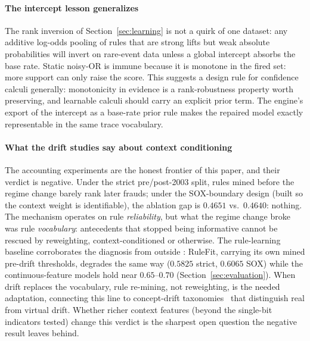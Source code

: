 \paragraph{The intercept lesson generalizes} The rank inversion of
Section~\ref{sec:learning} is not a quirk of one dataset: any additive
log-odds pooling of rules that are strong lifts but weak absolute
probabilities will invert on rare-event data unless a global intercept
absorbs the base rate. Static noisy-OR is immune because it is monotone
in the fired set: more support can only raise the score. This
suggests a design rule for confidence calculi generally: monotonicity in
evidence is a rank-robustness property worth preserving, and learnable
calculi should carry an explicit prior term. The engine's export of the
intercept as a base-rate prior rule makes the repaired model exactly
representable in the same trace vocabulary.

\paragraph{What the drift studies say about context conditioning} The
accounting experiments are the honest frontier of this paper, and their
verdict is negative. Under the strict pre/post-2003 split, rules mined
before the regime change barely rank later frauds; under the
SOX-boundary design (built so the context weight is identifiable),
the ablation gap is $0.4651$ vs.\ $0.4640$: nothing. The mechanism
operates on rule \emph{reliability}, but what the regime change broke
was rule \emph{vocabulary}: antecedents that stopped being informative
cannot be rescued by reweighting, context-conditioned or otherwise.
The rule-learning baseline corroborates the diagnosis from outside
\pla{}: RuleFit, carrying its own mined pre-drift thresholds, degrades
the same way ($0.5825$ strict, $0.6065$ SOX) while the
continuous-feature models hold near $0.65$--$0.70$
(Section~\ref{sec:evaluation}).
When drift replaces the vocabulary, rule re-mining, not reweighting,
is the needed adaptation, connecting this line to concept-drift
taxonomies~\cite{gama2014} that distinguish real from virtual drift.
Whether richer context features (beyond the single-bit indicators
tested) change this verdict is the sharpest open question the negative
result leaves behind.


